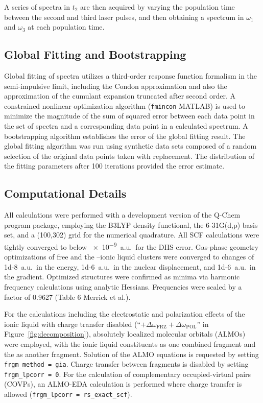 {A series of spectra in \(t_2\) are then acquired by varying the population time between the second and third laser pulses, and then obtaining a spectrum in \(\omega_1\) and \(\omega_3\) at each population time.

\subsection{Global Fitting and Bootstrapping}
\label{sec:anions_methods_fitting}
Global fitting of spectra utilizes a third-order response function formalism in the semi-impulsive limit, including the Condon approximation and also the approximation of the cumulant expansion truncated after second order. A constrained nonlinear optimization algorithm (\verb!fmincon! MATLAB) is used to minimize the magnitude of the sum of squared error between each data point in the set of spectra and a corresponding data point in a calculated spectrum. A bootstrapping algorithm \cite{numericalrecipes-92} establishes the error of the global fitting result. The global fitting algorithm was run using synthetic data sets composed of a random selection of the original data points taken with replacement. The distribution of the fitting parameters after 100 iterations provided the error estimate.

\subsection{Computational Details}
\label{sec:anions_methods_computational}
All calculations were performed with a development version of the Q-Chem program package\cite{Shao2015}, employing the B3LYP density functional, the 6-31G(d,p) basis set, and a (100,302) grid for the numerical quadrature. All SCF calculations were tightly converged to below \num{e-9}~a.u.\ for the DIIS error. Gas-phase geometry optimizations of free  and the --ionic liquid clusters were converged to changes of \num{1d-8}~a.u.\ in the energy, \num{1d-6}~a.u.\ in the nuclear displacement, and \num{1d-6}~a.u.\ in the gradient. Optimized structures were confirmed as minima via harmonic frequency calculations using analytic Hessians. Frequencies were scaled by a factor of \num{0.9627} (Table 6 Merrick et al.)\cite{Merrick2007}.

For the calculations including the electrostatic and polarization effects of the ionic liquid with charge transfer disabled (``\(+ \Delta \omega_\mathrm{FRZ} + \Delta \omega_\mathrm{POL}\)'' in Figure~\ref{fig:decomposition}), absolutely localized molecular orbitals (ALMOs)\cite{Khaliullin2006} were employed, with the ionic liquid constituents as one combined fragment and the  as another fragment. Solution of the ALMO equations is requested by setting \verb!frgm_method = gia!. Charge transfer between fragments is disabled by setting \verb!frgm_lpcorr = 0!. For the calculation of complementary occupied-virtual pairs (COVPs), an ALMO-EDA calculation is performed where charge transfer is allowed (\verb!frgm_lpcorr = rs_exact_scf!).

}
